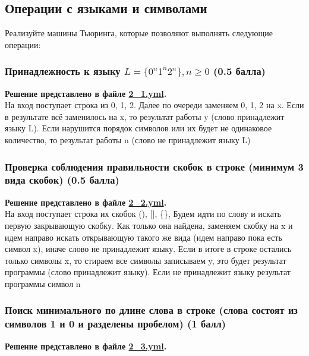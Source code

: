 \documentclass[a4paper,12pt]{article}
\begin{document}
\subsection{Операции с языками и символами}

Реализуйте машины Тьюринга, которые позволяют выполнять следующие операции:

\subsubsection{Принадлежность к языку $L = \{ 0^n1^n2^n \}, n \ge 0$ (0.5 балла)}

\textbf{Решение представлено в файле \href{https://github.com/NRU-MPEI-IMAI/tm-and-qc-NovichikhinIV/blob/main/yml/2_1.yml}{2\_1.yml}.} \\

На вход поступает строка из 0, 1, 2. Далее по очереди заменяем 0, 1, 2 на x. Если в результате всё заменилось на x, то результат работы y (слово принадлежит языку L). Если нарушится порядок символов или их будет не одинаковое количество, то результат работы n (слово не принадлежит языку L)


\subsubsection{Проверка соблюдения правильности скобок в строке (минимум 3 вида скобок) (0.5 балла)}

\textbf{Решение представлено в файле \href{https://github.com/NRU-MPEI-IMAI/tm-and-qc-NovichikhinIV/blob/main/yml/2_2.yml}{2\_2.yml}.} \\

На вход поступает строка их скобок (), [], \{\}, Будем идти по слову и искать первую закрывающую скобку. Как только она найдена, заменяем скобку на x и идем направо искать открывающую такого же вида (идем направо пока есть символ x), иначе слово не принадлежит языку. Если в итоге в строке остались только символы x, то стираем все символы записываем y, это будет результат программы (слово принадлежит языку). Если не принадлежит языку результат программы символ n

\subsubsection{Поиск минимального по длине слова в строке (слова состоят из символов 1 и 0 и разделены пробелом) (1 балл)}

\textbf{Решение представлено в файле \href{https://github.com/NRU-MPEI-IMAI/tm-and-qc-NovichikhinIV/blob/main/yml/2_3.yml}{2\_3.yml}.} \\
\end{document}
